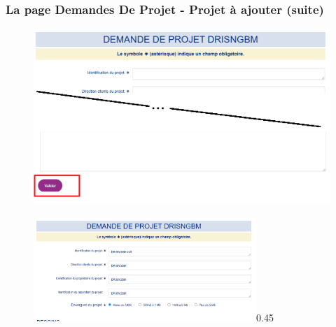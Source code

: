 \documentclass[aspectratio=169]{beamer}%
\let\note\relax
\begin{document}
\begin{frame}
\transwipe 
\label{pictures}
\frametitle{La page Demandes De Projet - Projet à ajouter (suite)}

\begin{figure}
\includegraphics[scale=0.33]{form_valider}
\end{figure}
\end{frame}
\begin{frame}
\transwipe 
  \centering
  

    \begin{figure}
    \centering
    \begin{annotate}{\includegraphics[width=0.75\textwidth]{Projet_a_soumettre}}{0.45}
        
    \end{annotate}
\end{figure}
 
    \end{frame}
    
\end{document}
